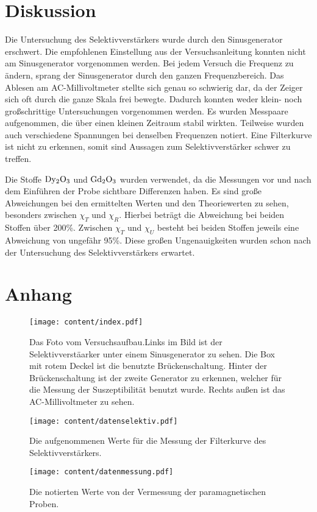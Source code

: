 \section{Diskussion}
\label{sec:Diskussion}

Die Untersuchung des Selektivverstärkers wurde durch den Sinusgenerator erschwert.
Die empfohlenen Einstellung aus der Versuchsanleitung konnten nicht am Sinusgenerator vorgenommen werden.
Bei jedem Versuch die Frequenz zu ändern, sprang der Sinusgenerator durch den ganzen Frequenzbereich.
Das Ablesen am AC-Millivoltmeter stellte sich genau so schwierig dar, da der Zeiger sich oft durch die ganze Skala frei bewegte.
Dadurch konnten weder klein- noch großschrittige Untersuchungen vorgenommen werden.
Es wurden Messpaare aufgenommen, die über einen kleinen Zeitraum stabil wirkten.
Teilweise wurden auch verschiedene Spannungen bei denselben Frequenzen notiert.
Eine Filterkurve ist nicht zu erkennen, somit sind Aussagen zum Selektivverstärker schwer zu treffen.

Die Stoffe $\ce{Dy2O3}$ und $\ce{Gd2O3}$ wurden verwendet, da die Messungen vor und nach dem Einführen der Probe sichtbare Differenzen haben.
Es sind große Abweichungen bei den ermittelten Werten und den Theoriewerten zu sehen, besonders zwischen $\chi_T$ und $\chi_R$.
Hierbei beträgt die Abweichung bei beiden Stoffen über 200\%.
Zwischen $\chi_T$ und $\chi_U$ besteht bei beiden Stoffen jeweils eine Abweichung von ungefähr 95\%.
Diese großen Ungenauigkeiten wurden schon nach der Untersuchung des Selektivverstärkers erwartet.

\section{Anhang}
\label{sec:Anhang}
\begin{figure}
    \centering
    \texttt{[image: content/index.pdf]}
    \caption{Das Foto vom Versuchsaufbau.Links im Bild ist der Selektivverstäarker unter einem Sinusgenerator zu sehen. 
    Die Box mit rotem Deckel ist die benutzte Brückenschaltung. 
    Hinter der Brückenschaltung ist der zweite Generator zu erkennen, welcher für die Messung der Suszeptibilität benutzt wurde.
    Rechts außen ist das AC-Millivoltmeter zu sehen.}
    \label{fig:datenselektiv1}
\end{figure}
\begin{figure}
    \centering
    \texttt{[image: content/datenselektiv.pdf]}
    \caption{Die aufgenommenen Werte für die Messung der Filterkurve des Selektivverstärkers.}
    \label{fig:datenselektiv2}
\end{figure}
\begin{figure}
    \centering
    \texttt{[image: content/datenmessung.pdf]}
    \caption{Die notierten Werte von der Vermessung der paramagnetischen Proben.}
    \label{fig:datenmessung}
\end{figure}
